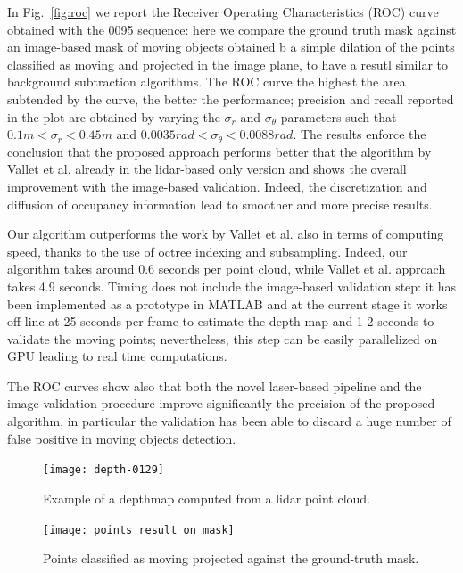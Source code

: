 In Fig.~\ref{fig:roc} we report the Receiver Operating Characteristics (ROC) curve obtained with the 0095 sequence: here we compare the ground truth mask against an image-based mask of moving objects obtained b a simple dilation of the points classified as moving and projected in the image plane, to have a resutl similar to background subtraction algorithms. 
The ROC curve the highest the area subtended by the curve, the better the performance; precision and recall reported in the plot are obtained by varying the $\sigma_r$ and $\sigma_{\theta}$ parameters such that $0.1m<\sigma_r<0.45m$ and $0.0035rad<\sigma_{\theta}<0.0088rad$.
The results enforce the conclusion that the proposed approach performs better that the algorithm by Vallet et al. already in the lidar-based only version and shows the overall improvement with the image-based validation. Indeed, the discretization and diffusion of occupancy information lead to smoother and more precise results.

Our algorithm outperforms the work by Vallet et al. also in terms of computing speed, thanks to the use of octree indexing and subsampling. 
Indeed, our algorithm takes around 0.6 seconds per point cloud, while Vallet et al. approach takes 4.9 seconds.
Timing does not include the image-based validation step: it has been implemented as a prototype in MATLAB and at the current stage it works off-line at 25 seconds per frame to estimate the depth map and 1-2 seconds to validate the moving points; nevertheless, this step can be easily parallelized on GPU leading to real time computations.

The ROC curves show also that both the novel laser-based pipeline and the image validation procedure improve significantly the precision of the proposed algorithm, in particular the validation has been able to discard a huge number of false positive in moving objects detection.

\begin{figure}[t]
\centering
\texttt{[image: depth-0129]}
\caption{Example of a depthmap computed from a lidar point cloud.}
\label{fig:depth}
\end{figure}

\begin{figure}[t]
\centering
\texttt{[image: points\_result\_on\_mask]}
\caption{Points classified as moving projected against the ground-truth mask.} 
\label{fig:points}
\end{figure}




